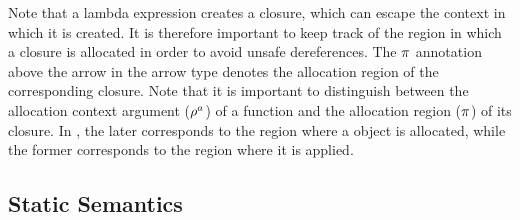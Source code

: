 Note that a lambda expression creates a closure, which can escape the
context in which it is created. It is therefore important to keep track of
the region in which a closure is allocated in order to avoid unsafe
dereferences. The $\pi$ annotation above the arrow in the arrow
type denotes the allocation region of the corresponding closure. Note
that it is important to distinguish between the allocation context
argument ($\rho^a$) of a function and the allocation region
($\pi$) of its closure. In \name, the later corresponds to the region where
a  object is allocated, while the former corresponds to the
region where it is applied. 

\subsection{Static Semantics}



\onecolumn


\twocolumn
